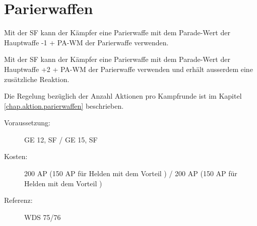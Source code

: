 \section{Parierwaffen}
\label{sf.parierwaffen}
Mit der SF  kann der Kämpfer eine Parierwaffe mit dem Parade-Wert der Hauptwaffe -1 + PA-WM der Parierwaffe verwenden.

Mit der SF  kann der Kämpfer eine Parierwaffe mit dem Parade-Wert der Hauptwaffe +2 + PA-WM der Parierwaffe verwenden und erhält ausserdem eine zusätzliche Reaktion.

Die Regelung bezüglich der Anzahl Aktionen pro Kampfrunde ist im Kapitel \ref{chap.aktion.parierwaffen} beschrieben.
\begin{description}
    \item[Voraussetzung:]
        GE 12, SF  / GE 15, SF 
    \item [Kosten:]
        200 AP (150 AP für Helden mit dem Vorteil ) / 200 AP (150 AP für Helden mit dem Vorteil )
    \item [Referenz:]
        WDS 75/76
\end{description}

